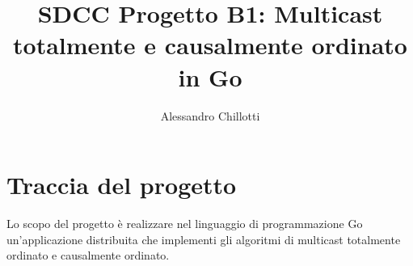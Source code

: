 \documentclass[acmtog]{acmart}
\begin{document}
\title{SDCC Progetto B1: Multicast totalmente e causalmente ordinato in Go}

\author{Alessandro Chillotti}

\begin{abstract}

\end{abstract}




\maketitle

\section{Traccia del progetto}
Lo scopo del progetto è realizzare nel linguaggio di programmazione Go un'applicazione distribuita che implementi gli algoritmi di multicast totalmente ordinato e causalmente ordinato.
\end{document}
